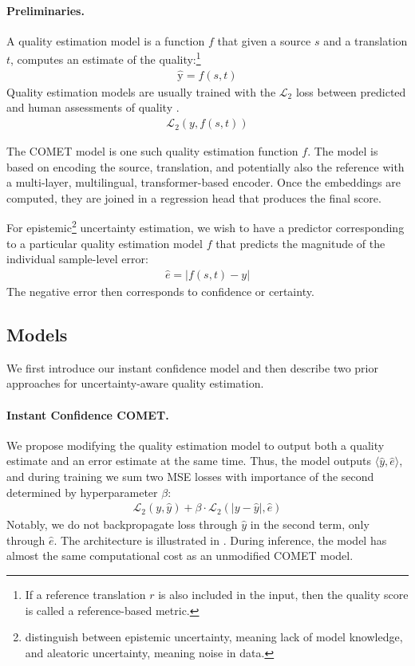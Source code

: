 \paragraph{Preliminaries.}
A quality estimation model is a function $f$ that given a source $s$ and a translation $t$, computes an estimate of the quality:\footnote{
If a reference translation $r$ is also included in the input, then the quality score is called a reference-based metric.
}
\begin{align}
\widehat{\mathrm{y}} = f(s, t)
\end{align}
Quality estimation models are usually trained with the $\mathcal{L}_2$ loss between predicted and human assessments of quality
\citep{kocmi-etal-2022-findings,kocmi-etal-2024-error,lommel2014multidimensional}.
\begin{align}
\mathcal{L}_2(y, f(s, t))
\end{align}

The COMET model \citep{rei-etal-2020-comet,rei-etal-2022-cometkiwi} is one such quality estimation function $f$.
The model is based on encoding the source, translation, and potentially also the reference with a multi-layer, multilingual, transformer-based encoder.
Once the embeddings are computed, they are joined in a regression head that produces the final score.

For epistemic\footnote{\citet{zerva-etal-2022-disentangling} distinguish between epistemic uncertainty, meaning lack of model knowledge, and aleatoric uncertainty, meaning noise in data.} uncertainty estimation, we wish to have a predictor corresponding to a particular quality estimation model $f$ that predicts the magnitude of the individual sample-level error:
\begin{align}
\hat{e} = |f(s, t) - y|
\end{align}
The negative error then corresponds to confidence or certainty.


\subsection{Models}

We first introduce our instant confidence model and then describe two prior approaches for uncertainty-aware quality estimation.


\paragraph{Instant Confidence COMET.}
We propose modifying the quality estimation model to output both a quality estimate and an error estimate at the same time.
Thus, the model outputs $\langle\hat{y}, \hat{e}\rangle$, and during training we sum two MSE losses with importance of the second determined by hyperparameter $\beta$:
\begin{align}
\mathcal{L}_2 (y, \hat{y})+ \beta\cdot
\mathcal{L}_2 (|y-\hat{y}|, \hat{e})
\end{align}
Notably, we do not backpropagate loss through $\hat{y}$ in the second term, only through $\hat{e}$.
The architecture is illustrated in .
During inference, the model has almost the same computational cost as an unmodified COMET model.



